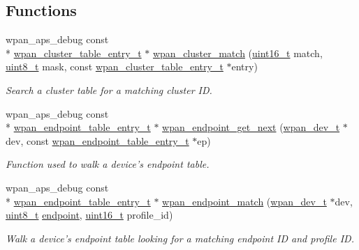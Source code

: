 \subsection*{Functions}
\begin{DoxyCompactItemize}
\item 
wpan\-\_\-aps\-\_\-debug const \\*
\hyperlink{structwpan__cluster__table__entry__t}{wpan\-\_\-cluster\-\_\-table\-\_\-entry\-\_\-t} $\ast$ \hyperlink{group__wpan__aps_ga1c725384b21faf5953683d7b028c7be3}{wpan\-\_\-cluster\-\_\-match} (\hyperlink{group__hal_ga5a8b2dc9e45a9ee81a94ef304fb62505}{uint16\-\_\-t} match, \hyperlink{group__hal_gae1affc9ca37cfb624959c866a73f83c2}{uint8\-\_\-t} mask, const \hyperlink{structwpan__cluster__table__entry__t}{wpan\-\_\-cluster\-\_\-table\-\_\-entry\-\_\-t} $\ast$entry)
\begin{DoxyCompactList}\small\item\em Search a cluster table for a matching cluster I\-D. \end{DoxyCompactList}\item 
wpan\-\_\-aps\-\_\-debug const \\*
\hyperlink{structwpan__endpoint__table__entry__t}{wpan\-\_\-endpoint\-\_\-table\-\_\-entry\-\_\-t} $\ast$ \hyperlink{group__wpan__aps_gaca3b72047ea4e156ce9a977c13624b5c}{wpan\-\_\-endpoint\-\_\-get\-\_\-next} (\hyperlink{structwpan__dev__t}{wpan\-\_\-dev\-\_\-t} $\ast$dev, const \hyperlink{structwpan__endpoint__table__entry__t}{wpan\-\_\-endpoint\-\_\-table\-\_\-entry\-\_\-t} $\ast$ep)
\begin{DoxyCompactList}\small\item\em Function used to walk a device's endpoint table. \end{DoxyCompactList}\item 
wpan\-\_\-aps\-\_\-debug const \\*
\hyperlink{structwpan__endpoint__table__entry__t}{wpan\-\_\-endpoint\-\_\-table\-\_\-entry\-\_\-t} $\ast$ \hyperlink{group__wpan__aps_ga0a88c1b17d1f9a42a53668b14f15e205}{wpan\-\_\-endpoint\-\_\-match} (\hyperlink{structwpan__dev__t}{wpan\-\_\-dev\-\_\-t} $\ast$dev, \hyperlink{group__hal_gae1affc9ca37cfb624959c866a73f83c2}{uint8\-\_\-t} \hyperlink{group__zdo_ga7d397493728da2bca8d55b2d61c4ec5d}{endpoint}, \hyperlink{group__hal_ga5a8b2dc9e45a9ee81a94ef304fb62505}{uint16\-\_\-t} profile\-\_\-id)
\begin{DoxyCompactList}\small\item\em Walk a device's endpoint table looking for a matching endpoint I\-D and profile I\-D. \end{DoxyCompactList}\item 

\end{DoxyCompactItemize}
